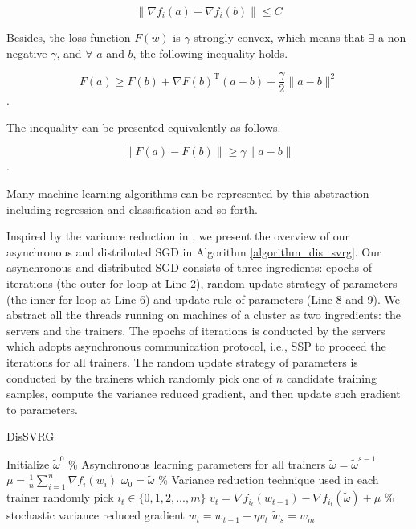 \documentclass[10pt,journal,finalsubmission,compsoc]{IEEEtran}
\begin{document}
 \begin{equation}
\label{equa_l_smooth3} 
\parallel \nabla f_i(a)-\nabla f_i(b)\parallel\le C
 \end{equation}


Besides, the loss function $F(w)$ is $\gamma$-strongly convex, which means that $\exists$ a non-negative $\gamma$, and $\forall$ $a$ and $b$, the following inequality holds.

\begin{equation}
\label{equa_gamma_convex} 
F(a)\ge F(b)+\nabla F(b)^\mathrm{T} (a-b)+\frac{\gamma}{2}\parallel a-b\parallel^2
\end{equation}.

The inequality can be presented equivalently as follows.

\begin{equation}
\label{equa_gamma_convex} 
\parallel F(a)-F(b)\parallel \ge \gamma \parallel a-b\parallel
\end{equation}.

Many machine learning algorithms can be represented by this abstraction including regression and classification and so forth. 

 
Inspired by the variance reduction in \cite{Johnson:9MAvkbgy}, we present the overview of our asynchronous and distributed SGD in Algorithm \ref{algorithm_dis_svrg}. Our asynchronous and distributed SGD consists of three ingredients: epochs of iterations (the outer for loop at Line 2), random update strategy of parameters (the inner for loop at Line 6) and update rule of parameters (Line 8 and 9). We abstract all the threads running on machines of a cluster as two ingredients: the servers and the trainers. The epochs of iterations is conducted by the servers which adopts asynchronous communication protocol, i.e., SSP to proceed the iterations for all trainers. The random update strategy of parameters is conducted by the trainers which randomly pick one of $n$ candidate training samples, compute the variance reduced gradient, and then update such gradient to parameters. 

\begin{algorithm}[t]
    \caption{DisSVRG}
    \label{algorithm_dis_svrg}
    \begin{algorithmic}[1]
        \State Initialize $\tilde{\omega}^0$
         \% Asynchronous learning parameters for all trainers
            \State $\tilde{\omega}=\tilde{\omega}^{s-1}$
            \State $\mu=\frac{1}{n}\sum\limits_{i=1}^n\nabla f_i(w_i)$
            \State $\omega_0=\tilde{\omega}$
             \% Variance reduction technique used in each trainer 
                \State randomly pick $i_t\in\{0,1,2,...,m\}$
                \State $v_t=\nabla f_{i_t}(w_{t-1})-\nabla f_{i_t}(\tilde{\omega})+\mu$ \% stochastic variance  reduced gradient
                \State $w_t=w_{t-1}-\eta v_t$
           \EndFor
           \State $\tilde{w}_s=w_m$
       \EndFor
    \end{algorithmic}
\end{algorithm}
\end{document}
